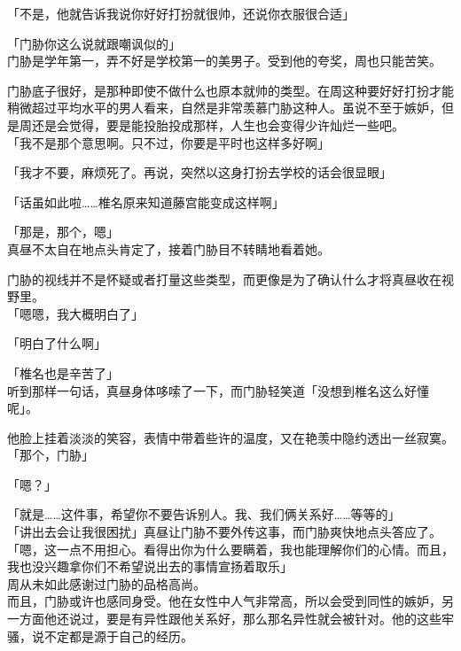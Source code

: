 「不是，他就告诉我说你好好打扮就很帅，还说你衣服很合适」

「门胁你这么说就跟嘲讽似的」\\

门胁是学年第一，弄不好是学校第一的美男子。受到他的夸奖，周也只能苦笑。

门胁底子很好，是那种即使不做什么也原本就帅的类型。在周这种要好好打扮才能稍微超过平均水平的男人看来，自然是非常羡慕门胁这种人。虽说不至于嫉妒，但是周还是会觉得，要是能投胎投成那样，人生也会变得少许灿烂一些吧。\\

「我不是那个意思啊。只不过，你要是平时也这样多好啊」

「我才不要，麻烦死了。再说，突然以这身打扮去学校的话会很显眼」

「话虽如此啦……椎名原来知道藤宫能变成这样啊」

「那是，那个，嗯」\\

真昼不太自在地点头肯定了，接着门胁目不转睛地看着她。

门胁的视线并不是怀疑或者打量这些类型，而更像是为了确认什么才将真昼收在视野里。\\

「嗯嗯，我大概明白了」

「明白了什么啊」

「椎名也是辛苦了」\\

听到那样一句话，真昼身体哆嗦了一下，而门胁轻笑道「没想到椎名这么好懂呢」。

他脸上挂着淡淡的笑容，表情中带着些许的温度，又在艳羡中隐约透出一丝寂寞。\\

「那个，门胁」

「嗯？」

「就是……这件事，希望你不要告诉别人。我、我们俩关系好……等等的」\\

「讲出去会让我很困扰」真昼让门胁不要外传这事，而门胁爽快地点头答应了。\\

「嗯，这一点不用担心。看得出你为什么要瞒着，我也能理解你们的心情。而且，我也没兴趣拿你们不希望说出去的事情宣扬着取乐」\\

周从未如此感谢过门胁的品格高尚。\\

而且，门胁或许也感同身受。他在女性中人气非常高，所以会受到同性的嫉妒，另一方面他还说过，要是有异性跟他关系好，那么那名异性就会被针对。他的这些牢骚，说不定都是源于自己的经历。\\

